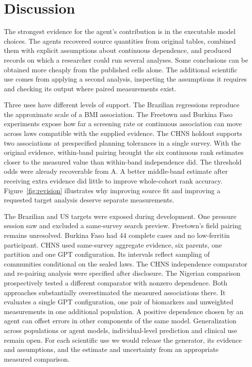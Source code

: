 \documentclass[sigconf,anonymous,review]{acmart}
\begin{document}
\section{Discussion}
The strongest evidence for the agent's contribution is in the executable model choices. The agents recovered source quantities from original tables, combined them with explicit assumptions about continuous dependence, and produced records on which a researcher could run several analyses. Some conclusions can be obtained more cheaply from the published cells alone. The additional scientific use comes from applying a second analysis, inspecting the assumptions it requires and checking its output where paired measurements exist.

Three uses have different levels of support. The Brazilian regressions reproduce the approximate scale of a BMI association. The Freetown and Burkina Faso experiments expose how far a screening rate or continuous association can move across laws compatible with the supplied evidence. The CHNS holdout supports two associations at prespecified planning tolerances in a single survey. With the original evidence, within-band pairing brought the six continuous rank estimates closer to the measured value than within-band independence did. The threshold odds were already recoverable from A. A better middle-band estimate after receiving extra evidence did little to improve whole-cohort rank accuracy. Figure~\ref{fig:revision} illustrates why improving source fit and improving a requested target analysis deserve separate measurements.

The Brazilian and US targets were exposed during development. One pressure session saw and excluded a same-survey search preview. Freetown's field pairing remains unresolved. Burkina Faso had 44 complete cases and no low-ferritin participant. CHNS used same-survey aggregate evidence, six parents, one partition and one GPT configuration. Its intervals reflect sampling of communities conditional on the sealed laws. The CHNS independence comparator and re-pairing analysis were specified after disclosure. The Nigerian comparison prospectively tested a different comparator with nonzero dependence. Both approaches substantially overestimated the measured associations there. It evaluates a single GPT configuration, one pair of biomarkers and unweighted measurements in one additional population. A positive dependence chosen by an agent can offset errors in other components of the same model. Generalization across populations or agent models, individual-level prediction and clinical use remain open. For each scientific use we would release the generator, its evidence and assumptions, and the estimate and uncertainty from an appropriate measured comparison.



\appendix

\end{document}
